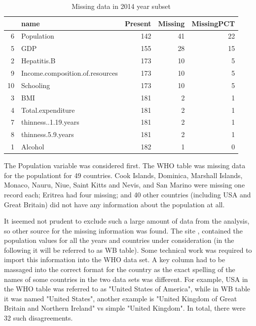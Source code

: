 \begin{table}[ht]
\centering
\begin{tabular}{rlrrr}
  \toprule
 & name & Present & Missing & MissingPCT \\ 
  \midrule
6 & Population & 142 &  41 &  22 \\ 
  5 & GDP & 155 &  28 &  15 \\ 
  2 & Hepatitis.B & 173 &  10 &   5 \\ 
  9 & Income.composition.of.resources & 173 &  10 &   5 \\ 
  10 & Schooling & 173 &  10 &   5 \\ 
  3 & BMI & 181 &   2 &   1 \\ 
  4 & Total.expenditure & 181 &   2 &   1 \\ 
  7 & thinness..1.19.years & 181 &   2 &   1 \\ 
  8 & thinness.5.9.years & 181 &   2 &   1 \\ 
  1 & Alcohol & 182 &   1 &   0 \\ 
   \bottomrule
\end{tabular}
\caption{Missing data in 2014 year subset}
\label{tab:missing}
\end{table}

The Population variable was considered first. The WHO table was missing data for the populationt for 49 countries. Cook Islands, Dominica, Marshall Islands, Monaco, Nauru, Niue, Saint Kitts and Nevis, and San Marino were missing one record each; Eritrea had four missing; and 40 other countries (including USA and Great Britain) did not have any information about the population at all.

It iseemed not prudent to exclude such a large amount of data from the analysis, so other source for the missing information was found. The site \cite{WB}, contained the population values for all the years and countries under consideration (in the following it will be referred to as WB table). Some technical work was required to import this information into the WHO data set. A key column had to be massaged into the correct format for the country as the exact spelling of the names of some countries in the two data sets was different. For example, USA in the WHO table was referred to as "United States of America", while in WB table it was named "United States", another example is "United Kingdom of Great Britain and Northern Ireland" vs simple "United Kingdom".  In total, there were 32 such disagreements.

